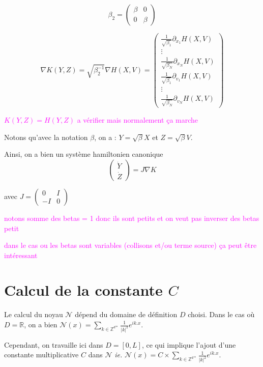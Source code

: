 \documentclass[a4paper,11pt]{article}
\newcommand{\carybe}[1]{ \textcolor{magenta}{#1}}
\begin{document}
$$
\beta_2 = \left( \begin{array}{cccc}
					\beta & 0  \\
					0 & \beta  
\end{array} \right)
$$

$$
\nabla K(Y,Z) = \sqrt{\beta_2^{-1}} \nabla H(X,V) = \left( \begin{array}{c}
	
	\frac{1}{\sqrt{\beta_1}}\partial_{x_1} H(X,V) \\
	\vdots \\
	\frac{1}{\sqrt{\beta_N}}\partial_{x_N} H(X,V) \\
	\frac{1}{\sqrt{\beta_1}}\partial_{v_1} H(X,V) \\
	\vdots \\
	\frac{1}{\sqrt{\beta_N}}\partial_{v_N} H(X,V) 

\end{array} \right)
$$

\carybe{$K(Y,Z) = H(Y,Z)$ a vérifier mais normalement ça marche}

Notons qu'avec la notation $\beta$, on a : $Y = \sqrt{\beta} X$ et $Z = \sqrt{\beta}V$.

Ainsi, on a bien un système hamiltonien canonique
$$\left( \begin{array}{cc}
 \dot{Y} \\ \dot{Z}
\end{array} \right) = J \nabla K
$$

avec $J = \left( \begin{array}{cc}
 0 & I \\ -I & 0
\end{array} \right)$

\carybe{notons somme des betas = 1 donc ils sont petits et on veut pas inverser des betas petit}

\carybe{dans le cas ou les betas sont variables (collisons et/ou terme source) ça peut être intéressant}

\section{Calcul de la constante $C$}
\label{noyau}

Le calcul du noyau $\mathcal{N}$ dépend du domaine de définition $D$ choisi. Dans le cas où $D = \mathbb{R}$, on a bien $\mathcal{N} (x) = \sum\limits _{k \in \mathbb{Z}^{d*}} \frac{1}{|k|^2} e^{ik.x}$.

Cependant, on travaille ici dans $D=[0, L]$, ce qui implique l'ajout d'une constante multiplicative $C$ dans $\mathcal{N}$ \emph{ie.} $\mathcal{N} (x) = C \times \sum\limits _{k \in \mathbb{Z}^{d*}} \frac{1}{|k|^2} e^{ik.x}$.
\end{document}
